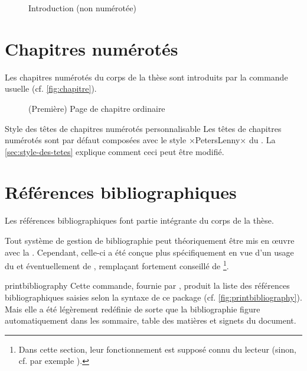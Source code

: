 \begin{figure}[p]
  \centering
  \caption{Introduction (non numérotée)}
  \label{fig:introduction}
\end{figure}

\section{Chapitres numérotés}
\label{sec:chapitres-numerotes}

Les chapitres numérotés du corps de la thèse sont introduits par la commande
usuelle  (cf. \vref{fig:chapitre}).

\begin{figure}[ht]
  \centering
  \caption[Chapitre ordinaire]{(Première) Page de chapitre
    ordinaire}
  \label{fig:chapitre}
\end{figure}

\begin{dbremark}{Style des têtes de chapitres numérotés personnalisable}{}
  Les têtes de chapitres numérotés sont par défaut composées avec le style
  ×PetersLenny× du . La \vref{sec:style-des-tetes} explique
  comment ceci peut être modifié.
\end{dbremark}

\section{Références bibliographiques}

Les références bibliographiques font partie intégrante du corps de la thèse.

Tout système de gestion de bibliographie peut théoriquement être mis en œuvre
avec la \yatcl. Cependant, celle-ci a été conçue plus spécifiquement en vue
d'un usage du  et éventuellement de ,
remplaçant fortement conseillé de \footnote{Dans cette section,
  leur fonctionnement est supposé connu du lecteur (sinon, cf. par exemple
  \cite{en-ligne6}).}.

\begin{docCommand}[doc description=\mandatory]{printbibliography}{}
  Cette commande, fournie par , produit la liste des
  références bibliographiques saisies selon la syntaxe de ce package (cf.
  \vref{fig:printbibliography}). Mais elle a été légèrement redéfinie de sorte
  que la bibliographie figure automatiquement dans les sommaire, table des
  matières et signets du document.
\end{docCommand}

